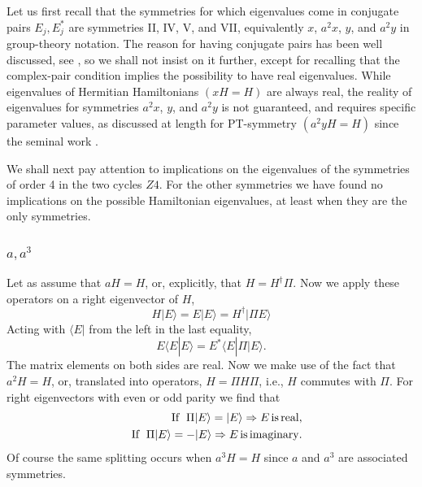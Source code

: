 {Let us first recall that the  symmetries for which eigenvalues come in conjugate pairs $E_j,E_j^*$
are symmetries II, IV, V, and VII, equivalently $x$, $a^2x$, $y$, and $a^2y$ in group-theory notation.
The reason for having conjugate pairs has been well discussed,
see \cite{Mostafazadeh2002,Mostafazadeh2002a,Mostafazadeh2002b,Simon2019a}, so we shall not insist on it further, except for recalling that
the complex-pair condition implies the possibility to have real eigenvalues. While eigenvalues of Hermitian Hamiltonians $(xH=H)$
are always real, the reality of eigenvalues for symmetries $a^2x$, $y$,
and $a^2y$ is not guaranteed, and
requires specific parameter values, as discussed at length for PT-symmetry $(a^2yH=H)$  since the seminal work
\cite{Bender1998}.

We shall next pay attention to implications on the eigenvalues of the symmetries of order 4 in the two cycles $Z4$.
For the other symmetries we have found no implications on the possible Hamiltonian eigenvalues, at least when they
are the only symmetries.
%
\subsubsection{$a, a^3$}
%
%
Let as assume that $aH=H$, or, explicitly, that $H=H^\dagger \Pi$.
Now we apply these operators on a right  eigenvector of $H$,
%
\begin{equation}
H|E\rangle=E|E\rangle=H^\dagger |\Pi E\rangle
\end{equation}
%
Acting with $\langle E|$ from the left in the last equality,
%
\begin{equation}
E\langle E|E\rangle=E^*\langle E|\Pi|E\rangle.
\label{condit}
\end{equation}
%
The matrix elements on both sides are real. Now we make use of the fact that
$a^2H=H$, or, translated into operators, $H=\Pi H\Pi$, i.e., $H$ commutes with $\Pi$.
For right eigenvectors with even or odd parity we find that
%
\begin{eqnarray}
&&{\rm If}\;\; \Pi|E\rangle=|E\rangle \Rightarrow E\, {\rm is\, real},
\\
&&{\rm If}\;\; \Pi|E\rangle=-|E\rangle \Rightarrow E\, {\rm is\, imaginary}.
\end{eqnarray}
%
Of course the same splitting occurs when $a^3H=H$ since $a$ and $a^3$ are associated symmetries.
%
}
